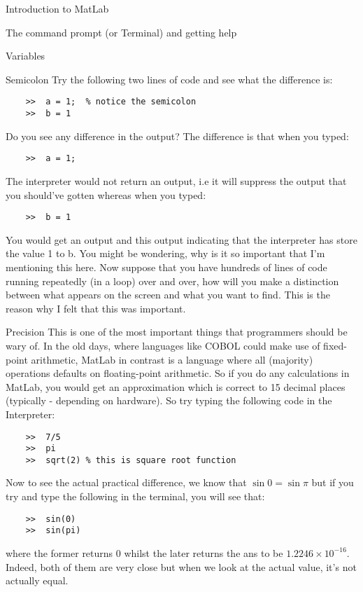 \documentclass[11pt, oneside]{report}   	%
\begin{document}
\begin{chapter}{Introduction to MatLab}
\begin{section}{The command prompt (or Terminal) and getting help}
\begin{subsection}{Variables}
\end{subsection}

\begin{subsection}{Semicolon}
Try the following two lines of code and see what the difference is:

\begin{lstlisting}
	>>	a = 1;  % notice the semicolon
	>>	b = 1
\end{lstlisting}
Do you see any difference in the output? The difference is that when you typed:

\begin{lstlisting}
	>>	a = 1;
\end{lstlisting}
The interpreter would not return an output, i.e it will suppress the output that you should've gotten whereas when
you typed:
\begin{lstlisting}
	>>	b = 1
\end{lstlisting}
You would get an output and this output indicating that the interpreter has store the value 1 to b. You might be
wondering, why is it so important that I'm mentioning this here.
Now suppose that you have hundreds of lines of code running repeatedly (in a loop) over and over, how will you
make a distinction between what appears on the screen and what you want to find. This is the reason why I felt that
this was important. 

\end{subsection}

\begin{subsection}{Precision}
This is one of the most important things that programmers should be wary of. In the old days, where languages like
COBOL could make use of fixed-point arithmetic, MatLab in contrast is a language where all (majority) operations
defaults on floating-point arithmetic. So if you do any calculations in MatLab, you would get an approximation which
is correct to 15 decimal places (typically - depending on hardware). So try typing the following code in the
Interpreter:

\begin{lstlisting}
	>>	7/5
	>>	pi
	>>	sqrt(2) % this is square root function
\end{lstlisting}
Now to see the actual practical difference, we know that $\sin{0} = \sin{\pi}$ but if you try and type the following in
the terminal, you will see that:

\begin{lstlisting}
	>>	sin(0)
	>>	sin(pi)
\end{lstlisting}
where the former returns $0$ whilst the later returns the ans to be $1.2246 \times 10^{-16}$. Indeed, both of them
are very close but when we look at the actual value, it's not actually equal.


\end{subsection}
\end{section}
\end{chapter}
\end{document}
